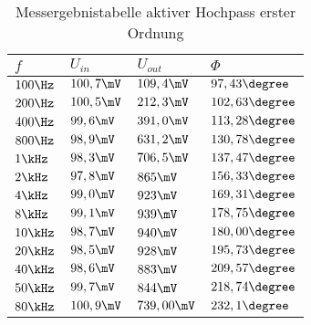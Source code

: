 \begin{table}[H]
\centering
\caption{Messergebnistabelle aktiver Hochpass erster Ordnung}
\label{tab:HP_erg_tab}
\begin{tabular}{|l|l|l|l|}
\hline
\rowcolor[HTML]{C0C0C0} 
$f    $&$ U_{in}    $&$ U_{out}      $&$ \Phi  $\\ \hline
$100\Hz  $&$ 100,7\mV $&$ 109,4\mV  $&$ 97,43\degree  $\\ \hline
$200\Hz  $&$ 100,5\mV $&$ 212,3\mV  $&$ 102,63\degree $\\ \hline
$400\Hz  $&$ 99,6\mV  $&$ 391,0\mV  $&$ 113,28\degree $\\ \hline
$800\Hz  $&$ 98,9\mV  $&$ 631,2\mV  $&$ 130,78\degree $\\ \hline
$1\kHz  $&$ 98,3\mV  $&$ 706,5\mV  $&$ 137,47\degree $\\ \hline
$2\kHz  $&$ 97,8\mV  $&$ 865\mV    $&$ 156,33\degree $\\ \hline
$4\kHz  $&$ 99,0\mV  $&$ 923\mV    $&$ 169,31\degree $\\ \hline
$8\kHz  $&$ 99,1\mV  $&$ 939\mV    $&$ 178,75\degree $\\ \hline
$10\kHz $&$ 98,7\mV  $&$ 940\mV    $&$ 180,00\degree $\\ \hline
$20\kHz $&$ 98,5\mV  $&$ 928\mV    $&$ 195,73\degree $\\ \hline
$40\kHz $&$ 98,6\mV  $&$ 883\mV    $&$ 209,57\degree $\\ \hline
$50\kHz $&$ 99,7\mV  $&$ 844\mV    $&$ 218,74\degree $\\ \hline
$80\kHz $&$ 100,9\mV $&$ 739,00\mV $&$ 232,1\degree $\\ \hline
\end{tabular}
\end{table}